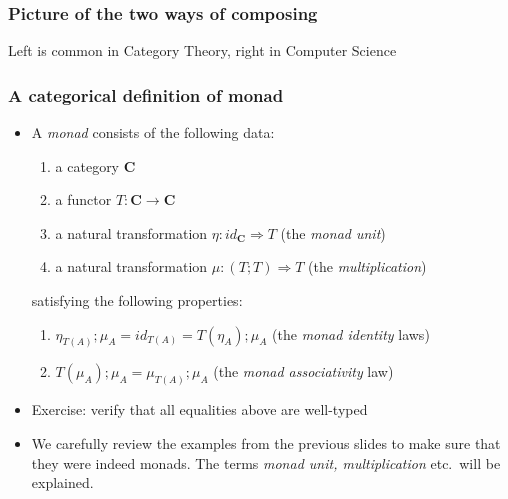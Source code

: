 \documentclass[handout]{beamer}
\newcommand{\To}{\Rightarrow}
\newcommand{\bfsf}[1]{{\boldsymbol{#1}}}
\newcommand{\CC}{\bfsf{C}}
\begin{document}
\frame
  {   
    \frametitle{Picture of the two ways of composing}\label{Mon5:PicTwoMonad}



\vspace*{1em}
Left is common in Category Theory, right in Computer Science


 }


\frame
  {   
    \frametitle{A categorical definition of monad}\label{Mon5:CatDefMonad}

 \begin{itemize}[<+->]
\item A \emph{monad} consists of the following data:
 \begin{enumerate}
    \item a category $\CC$
    \item a functor $T:\CC\to\CC$
    \item a natural transformation $\eta: id_\CC \To T$ (the \emph{monad unit})
    \item a natural transformation $\mu: (T;T) \To T$ (the \emph{multiplication})
 \end{enumerate}
satisfying the following properties:
 \begin{enumerate}
    \item $\eta_{T(A)};\mu_A = id_{T(A)} = T(\eta_A);\mu_A$ (the \emph{monad identity} laws)
    \item $T(\mu_A);\mu_A = \mu_{T(A)};\mu_A$ (the \emph{monad associativity} law)
 \end{enumerate}
\item Exercise: verify that all equalities above are well-typed
\item We carefully review the examples from the previous slides to 
make sure that they were indeed monads. 
The terms \emph{monad unit, multiplication} etc.\ will be explained.
 \end{itemize}

 }
\end{document}
